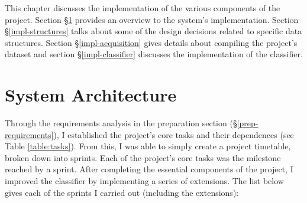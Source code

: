 \documentclass[12pt,a4paper,twoside,openright]{report}
\begin{document}

This chapter discusses the implementation of the various components of the project. Section \S\ref{impl-architecture} provides an overview to the system's implementation. Section \S\ref{impl-structures} talks about some of the design decisions related to specific data structures. Section \S\ref{impl-acquisition} gives details about compiling the project's dataset and section \S\ref{impl-classifier} discusses the implementation of the classifier.


\section{System Architecture} \label{impl-architecture}

Through the requirements analysis in the preparation section (\S\ref{prep-requirements}), I established the project's core tasks and their dependences (see Table \ref{table:tasks}). From this, I was able to simply create a project timetable, broken down into sprints. Each of the project's core tasks was the milestone reached by a sprint. After completing the essential components of the project, I improved the classifier by implementing a series of extensions. The list below gives each of the sprints I carried out (including the extensions):
\end{document}
